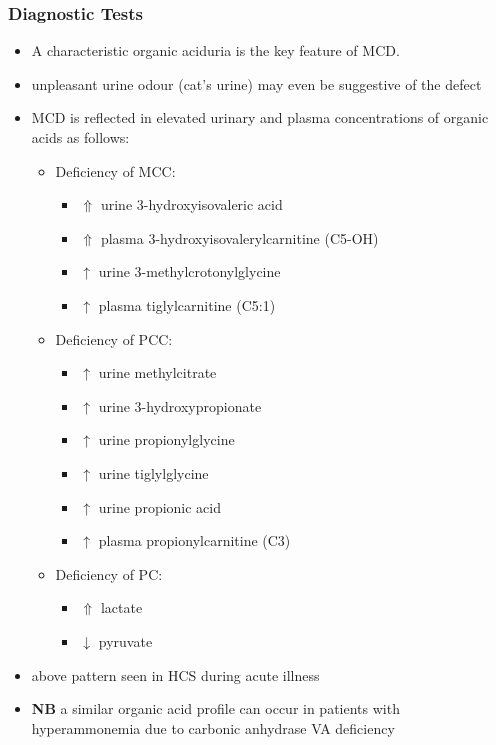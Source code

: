 \documentclass{scrartcl}
\begin{document}
\subsubsection{Diagnostic Tests}
\label{sec:orgdf39131}
\begin{itemize}
\item A characteristic organic aciduria is the key feature of MCD.
\item unpleasant urine odour (cat’s urine) may even be suggestive of the
defect
\item MCD is reflected in elevated urinary and plasma concentrations of
organic acids as follows:
\begin{itemize}
\item Deficiency of MCC:
\begin{itemize}
\item \(\Uparrow\) urine 3-hydroxyisovaleric acid
\item \(\Uparrow\) plasma 3-hydroxyisovalerylcarnitine (C5-OH)
\item \(\uparrow\) urine 3-methylcrotonylglycine
\item \(\uparrow\) plasma tiglylcarnitine (C5:1)
\end{itemize}
\item Deficiency of PCC:
\begin{itemize}
\item \(\uparrow\) urine methylcitrate
\item \(\uparrow\) urine 3-hydroxypropionate
\item \(\uparrow\) urine propionylglycine
\item \(\uparrow\) urine tiglylglycine
\item \(\uparrow\) urine propionic acid
\item \(\uparrow\) plasma propionylcarnitine (C3)
\end{itemize}
\item Deficiency of PC:
\begin{itemize}
\item \(\Uparrow\) lactate
\item \(\downarrow\) pyruvate
\end{itemize}
\end{itemize}
\item above pattern seen in HCS during acute illness
\item \textbf{NB} a similar organic acid profile can occur in patients with
hyperammonemia due to carbonic anhydrase VA deficiency
\end{itemize}
\end{document}
